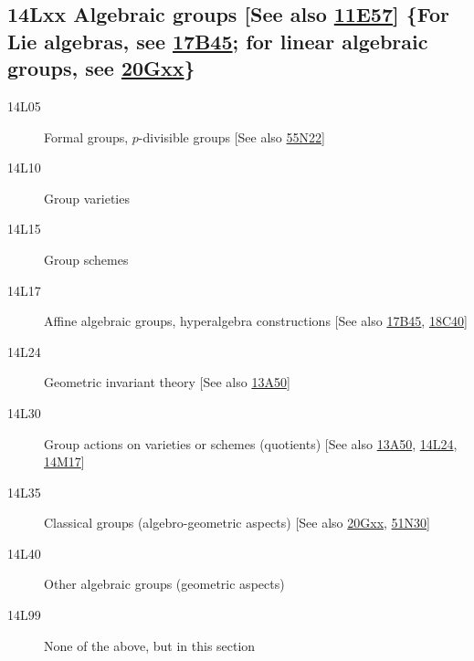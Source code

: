 \subsection*{14Lxx Algebraic groups [See also \hyperref[11E57]{11E57}] \{For Lie algebras, see \hyperref[17B45]{17B45}; for linear algebraic groups, see \hyperref[20Gxx]{20Gxx}\} }\label{14Lxx}
\begin{description}               
\item [14L05]\label{14L05} Formal groups, $p$-divisible groups [See also \hyperref[55N22]{55N22}]
\item [14L10]\label{14L10} Group varieties
\item [14L15]\label{14L15} Group schemes
\item [14L17]\label{14L17} Affine algebraic groups, hyperalgebra constructions [See also \hyperref[17B45]{17B45}, \hyperref[18C40]{18C40}]
\item [14L24]\label{14L24} Geometric invariant theory [See also \hyperref[13A50]{13A50}]
\item [14L30]\label{14L30} Group actions on varieties or schemes (quotients) [See also \hyperref[13A50]{13A50}, \hyperref[14L24]{14L24}, \hyperref[14M17]{14M17}]
\item [14L35]\label{14L35} Classical groups (algebro-geometric aspects) [See also \hyperref[20Gxx]{20Gxx}, \hyperref[51N30]{51N30}]
\item [14L40]\label{14L40} Other algebraic groups (geometric aspects)
\item [14L99]\label{14L99} None of the above, but in this section
\end{description}          
